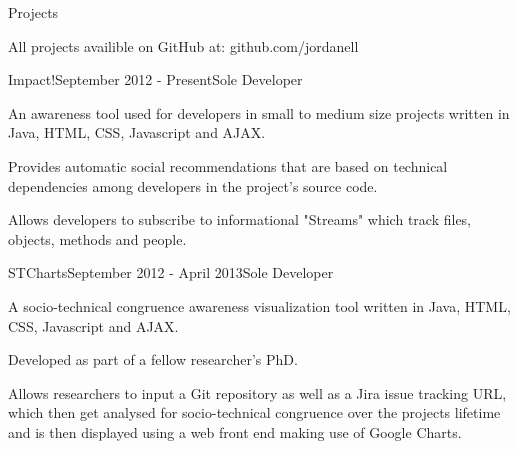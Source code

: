 \documentclass{resume} %
\begin{document}

\begin{rSection}{Projects}

All projects availible on GitHub at: github.com/jordanell

\begin{rSubsection}{Impact!}{September 2012 - Present}{Sole Developer}{}
\item An awareness tool used for developers in small to medium size projects written in Java, HTML, CSS, Javascript and AJAX.
\item Provides automatic social recommendations that are based on technical dependencies among developers in the project's source code.
\item Allows developers to subscribe to informational "Streams" which track files, objects, methods and people.
\end{rSubsection}

\begin{rSubsection}{STCharts}{September 2012 - April 2013}{Sole Developer}{}
\item A socio-technical congruence awareness visualization tool written in Java, HTML, CSS, Javascript and AJAX.
\item Developed as part of a fellow researcher's PhD.
\item Allows researchers to input a Git repository as well as a Jira issue tracking URL, which then get analysed for socio-technical congruence over the projects lifetime and is then
displayed using a web front end making use of Google Charts.
\end{rSubsection}

\end{rSection}





\end{document}
